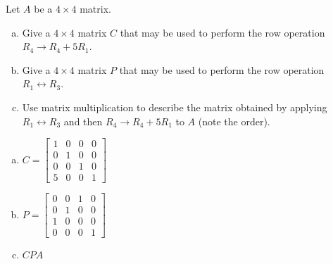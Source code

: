 
\begin{exerciseStatement}


Let \(A\) be a \(4 \times 4\) matrix.


\begin{enumerate}[(a)]
\item Give a \(4 \times 4\) matrix \(C\) that may be used to perform the row operation \( R_4 \to R_4 + 5R_1 \).
\item Give a \(4 \times 4\) matrix \(P\) that may be used to perform the row operation \( R_1 \leftrightarrow R_3 \).
\item Use matrix multiplication to describe the matrix obtained by applying \( R_1 \leftrightarrow R_3 \) and then \( R_4 \to R_4 + 5R_1 \) to \(A\) (note the order). 
\end{enumerate}
    
\end{exerciseStatement}
    
\begin{exerciseAnswer} 

\begin{enumerate}[(a)]
\item \(C= \left[\begin{array}{cccc}
1 & 0 & 0 & 0 \\
0 & 1 & 0 & 0 \\
0 & 0 & 1 & 0 \\
5 & 0 & 0 & 1
\end{array}\right] \)
\item \(P= \left[\begin{array}{cccc}
0 & 0 & 1 & 0 \\
0 & 1 & 0 & 0 \\
1 & 0 & 0 & 0 \\
0 & 0 & 0 & 1
\end{array}\right] \)
\item \(CPA\)
\end{enumerate}
    
\end{exerciseAnswer}
    
